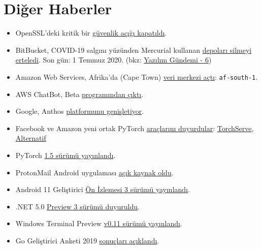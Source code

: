 \documentclass[11pt]{article}
\begin{document}
\section{Diğer Haberler}
\label{sec:orga73d719}
\begin{itemize}
\item OpenSSL'deki kritik bir \href{https://www.openssl.org/news/secadv/20200421.txt}{güvenlik açığı kapatıldı}.
\item BitBucket, COVID-19 salgını yüzünden Mercurial kullanan \href{https://bitbucket.org/blog/sunsetting-mercurial-support-in-bitbucket}{depoları silmeyi
erteledi}. Son gün: 1 Temmuz 2020. (bkz: \href{../../2019/06/yazilim-gundemi-06.pdf}{Yazılım Gündemi - 6})
\item Amazon Web Services, Afrika'da (Cape Town) \href{https://aws.amazon.com/blogs/aws/now-open-aws-africa-cape-town-region/}{veri merkezi açtı}: \texttt{af-south-1}.
\item AWS ChatBot, Beta \href{https://aws.amazon.com/blogs/aws/aws-chatbot-chatops-for-slack-and-chime/}{programından çıktı}.
\item Google, Anthos \href{https://cloud.google.com/blog/topics/anthos/anthos-for-aws-is-now-ga}{platformunu genişletiyor}.
\item Facebook ve Amazon yeni ortak PyTorch \href{https://aws.amazon.com/blogs/aws/announcing-torchserve-an-open-source-model-server-for-pytorch/}{araçlarını duyurdular}: \href{https://github.com/pytorch/serve}{TorchServe},
\href{https://ai.facebook.com/blog/facebook-ai-aws-partner-to-release-new-pytorch-libraries-/}{Alternatif}
\item PyTorch \href{https://pytorch.org/blog/pytorch-1-dot-5-released-with-new-and-updated-apis/}{1.5 sürümü yayınlandı}.
\item ProtonMail Android uygulaması \href{https://protonmail.com/blog/android-open-source/}{açık kaynak oldu}.
\item Android 11 Geliştirici \href{https://android-developers.googleblog.com/2020/04/android-11-developer-preview-3.html}{Ön İzlemesi 3 sürümü yayınlandı}.
\item .NET 5.0 \href{https://devblogs.microsoft.com/dotnet/announcing-net-5-0-preview-3/}{Preview 3 sürümü duyuruldu}.
\item Windows Terminal Preview \href{https://devblogs.microsoft.com/commandline/windows-terminal-preview-v0-11-release/}{v0.11 sürümü yayınlandı}.
\item Go Geliştirici Anketi 2019 \href{https://blog.golang.org/survey2019-results}{sonuçları açıklandı}.

\end{itemize}
\end{document}
